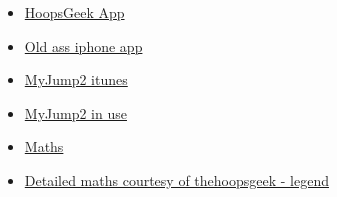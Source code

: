 \begin{itemize}
	\item \href{https://www.thehoopsgeek.com/measurement-app/#manual}{HoopsGeek App}
	\item \href{https://apps.apple.com/us/app/fitnessmeter-test-measure/id477488986}{Old ass iphone app}
	\item \href{https://apps.apple.com/gb/app/my-jump-2/id1148617550#?platform=iphone}{MyJump2 itunes}
	\item \href{https://www.youtube.com/watch?v=tIBiHDyev6w}{MyJump2 in use}
	\item \href{https://www.topendsports.com/testing/products/vertical-jump/video.htm}{Maths}
	\item \href{https://www.thehoopsgeek.com/the-physics-of-the-vertical-jump/}{Detailed maths courtesy of thehoopsgeek - legend}
\end{itemize}